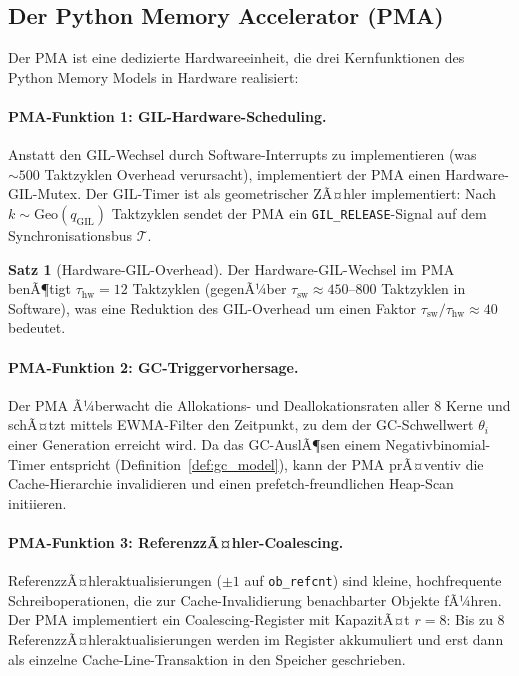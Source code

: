 ﻿\documentclass[a4paper,12pt]{scrreprt}
\theoremstyle{definition}
\newtheorem{satz}{Satz}[section]
\newcommand{\Geo}{\mathrm{Geo}}
\begin{document}
	\subsection{Der Python Memory Accelerator (PMA)}
	
	Der PMA ist eine dedizierte Hardwareeinheit, die drei Kernfunktionen
	des Python Memory Models in Hardware realisiert:
	
	\paragraph{PMA-Funktion 1: GIL-Hardware-Scheduling.}
	Anstatt den GIL-Wechsel durch Software-Interrupts zu implementieren
	(was $\sim 500$ Taktzyklen Overhead verursacht), implementiert der PMA
	einen Hardware-GIL-Mutex. Der GIL-Timer ist als geometrischer ZÃ¤hler
	implementiert: Nach $k \sim \Geo(q_{\mathrm{GIL}})$ Taktzyklen sendet
	der PMA ein \texttt{GIL\_RELEASE}-Signal auf dem Synchronisationsbus
	$\mathcal{T}$.
	
	\begin{satz}[Hardware-GIL-Overhead]
		\label{satz:hardware_gil}
		Der Hardware-GIL-Wechsel im PMA benÃ¶tigt $\tau_{\mathrm{hw}} = 12$
		Taktzyklen (gegenÃ¼ber $\tau_{\mathrm{sw}} \approx 450$--$800$ Taktzyklen
		in Software), was eine Reduktion des GIL-Overhead um einen Faktor
		$\tau_{\mathrm{sw}}/\tau_{\mathrm{hw}} \approx 40$ bedeutet.
	\end{satz}
	
	\paragraph{PMA-Funktion 2: GC-Triggervorhersage.}
	Der PMA Ã¼berwacht die Allokations- und Deallokationsraten aller 8 Kerne
	und schÃ¤tzt mittels EWMA-Filter den Zeitpunkt, zu dem der GC-Schwellwert
	$\theta_i$ einer Generation erreicht wird. Da das GC-AuslÃ¶sen einem
	Negativbinomial-Timer entspricht (Definition~\ref{def:gc_model}), kann
	der PMA prÃ¤ventiv die Cache-Hierarchie invalidieren und einen
	prefetch-freundlichen Heap-Scan initiieren.
	
	\paragraph{PMA-Funktion 3: ReferenzzÃ¤hler-Coalescing.}
	ReferenzzÃ¤hleraktualisierungen ($\pm 1$ auf \texttt{ob\_refcnt}) sind
	kleine, hochfrequente Schreiboperationen, die zur Cache-Invalidierung
	benachbarter Objekte fÃ¼hren. Der PMA implementiert ein Coalescing-Register
	mit KapazitÃ¤t $r = 8$: Bis zu 8 ReferenzzÃ¤hleraktualisierungen werden
	im Register akkumuliert und erst dann als einzelne Cache-Line-Transaktion
	in den Speicher geschrieben.
	
\end{document}
